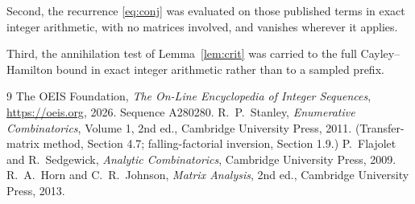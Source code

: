 \documentclass[11pt,a4paper]{article}
\theoremstyle{plain}
\theoremstyle{definition}
\begin{document}
Second, the recurrence \eqref{eq:conj} was evaluated on those published terms in exact
integer arithmetic, with no matrices involved, and vanishes wherever it applies.

Third, the annihilation test of Lemma~\ref{lem:crit} was carried to the full
Cayley--Hamilton bound in exact integer arithmetic rather than to a sampled prefix.

\begin{thebibliography}{9}
 The OEIS Foundation, \emph{The On-Line Encyclopedia of Integer
Sequences}, \url{https://oeis.org}, 2026. Sequence A280280.
 R.~P.~Stanley, \emph{Enumerative Combinatorics}, Volume 1, 2nd ed.,
Cambridge University Press, 2011. (Transfer-matrix method, Section 4.7; falling-factorial
inversion, Section 1.9.)
 P.~Flajolet and R.~Sedgewick, \emph{Analytic Combinatorics}, Cambridge
University Press, 2009.
 R.~A.~Horn and C.~R.~Johnson, \emph{Matrix Analysis}, 2nd ed., Cambridge
University Press, 2013.
\end{thebibliography}
\end{document}
